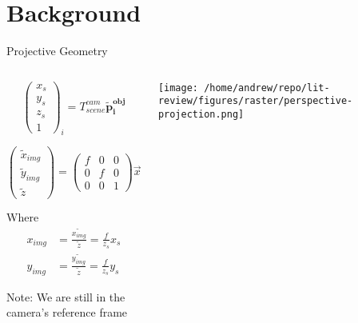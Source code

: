 \documentclass[presentation, aspectratio=1610]{beamer}
\begin{document}
\section{Background}
\label{sec:orge068d6d}
\begin{frame}[label={sec:orge12b789}]{Projective Geometry}
\begin{columns}
\begin{column}{0.5\columnwidth}
\begin{equation*}
  \begin{pmatrix}
    x_{s} \\ y_{s} \\ z_{s} \\ 1
  \end{pmatrix}_{i} = T^{cam}_{scene} \mathbf{\tilde{p}^{obj}_{i}}
\end{equation*}

\begin{equation*}
  \begin{pmatrix}
    \tilde{x}_{img} \\ \tilde{y}_{img} \\ \tilde{z}
  \end{pmatrix} =
  \begin{pmatrix}
    f& 0 & 0 \\ 0 & f & 0 \\ 0 & 0 & 1
  \end{pmatrix} \vec{x}_{s}
\end{equation*}

Where
\begin{equation*}
  \begin{aligned}
    x_{img} &= \frac{\tilde{x_{img}}}{\tilde{z}} = \frac{f}{z_{s}}x_{s} \\
    y_{img} &= \frac{\tilde{y_{img}}}{\tilde{z}} = \frac{f}{z_{s}}y_{s}
  \end{aligned}
\end{equation*}

{\tiny Note: We are still in the camera's reference frame}
\end{column}

\begin{column}{0.6\columnwidth}
\begin{center}
\texttt{[image: /home/andrew/repo/lit-review/figures/raster/perspective-projection.png]}
\end{center}
\end{column}
\end{columns}
\end{frame}
\end{document}
